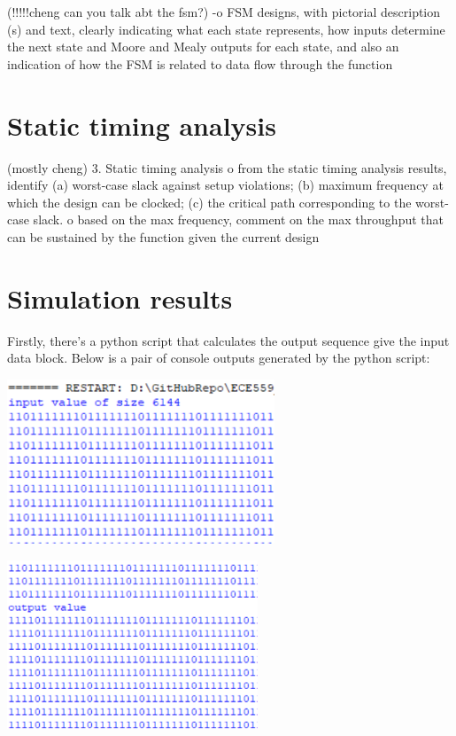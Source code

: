\documentclass[letterpaper, 12pt]{article} %
\begin{document}
(!!!!!cheng can you talk abt the fsm?)
-o  FSM designs, with pictorial description (s)
            and text, clearly indicating what each state
            represents, how inputs determine the next state and Moore and Mealy
            outputs for each state, and also an indication of how the FSM is
            related to data flow through the function


\section{Static timing analysis}
(mostly cheng)
    3.  Static timing analysis
		 o  from the static timing analysis results, identify (a) worst-case slack
		 	against setup violations;  (b) maximum frequency at which the design
			can be clocked;  (c) the critical path corresponding to the worst-case
			slack.
		 o	based on the max frequency, comment on the max throughput that can
		 	be sustained by the function given the current design
\section{Simulation results}

Firstly, there's a python script that calculates the output sequence give the input data block. Below is a pair of console outputs generated by the python script:

\begin{minipage}{.49\textwidth}
\includegraphics[width=8cm, angle=0]{files/ci.png}
\centering
{}
\centering
\end{minipage}
\begin{minipage}{.49\textwidth}
\includegraphics[width=7.5cm, angle=0]{files/cpii.png}
\centering
{}
\centering
\end{minipage}
\bigskip
\end{document}
